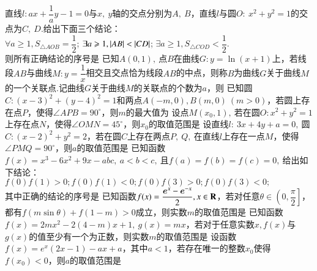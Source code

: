 \documentclass{BHCexam}
\begin{document}
\begin{questions}
\qs 直线$ l:ax+\dfrac{1}{a}y-1=0 $与$x,~y$轴的交点分别为$ A,~B $，直线$ l $与圆$ O:~x^2+y^2=1 $的交点为$ C,~D .$给出下面三个结论：\\
 $ \forall a\ge 1,S_{\triangle AOB}=\dfrac{1}{2} $;\qquad
{} $\exists a\geqslant1,\left| AB \right|<\left| CD \right|$;\qquad
{} $\exists a\ge 1,S_{\triangle COD}<\dfrac{1}{2}$.\\
则所有正确结论的序号是\xx
{} 
\qs 已知$ A(0,1),~ $点$ B $在曲线$ G:y=\ln (x+1) $上，若线段$ AB $与曲线$ M:y=\dfrac{1}{x} $相交且交点恰为线段$ AB $的中点，则称$ B $为曲线$ G $关于曲线$ M $的一个关联点.记曲线$ G $关于曲线$ M $的关联点的个数为$ a $，则\xx
{}
\qs 已知圆$ C:(x-3)^2+(y-4)^2=1 $和两点$ A(-m,0),B(m,0)~(m>0) $，若圆上存在点$ P $，使得$ \angle APB=90^{\circ} $，则$ m $的最大值为\xx
{}
\qs 设点$ M(x_0,1),~ $若在圆$ O: x^2+y^2=1 $上存在点$ N $，使得$ \angle OMN=45^{\circ} $，则$ x_0 $的取值范围是\xx
{}
\qs 设直线$ l:~3x+4y+a=0,~ $圆$ C:(x-2)^2+y^2=2 $，若在圆$ C $上存在两点$ P,~Q,~ $在直线$ l $上存在一点$ M $，使得$ \angle PMQ =90^{\circ}$，则$ a $的取值范围是\xx
{}
\qs 已知函数$f(x)=x^3-6x^2+9x-abc,~a<b<c,~$且$ f(a)=f(b)=f(c)=0 ,~$给出如下结论：\\
 $ f(0)f(1)>0 ;$\quad {}$f(0)f(1)<0;$\quad {}$f(0)f(3)>0;$\quad {}$f(0)f(3)<0;$\\
其中正确的结论的序号是\xx
{}
\qs 已知函数$f(x)=\dfrac{\bm{e}^x-\bm{e}^{-x}}{2},x\in\mathbf{R}$，若对任意$ \theta\in\left(0,\dfrac{\pi}{2}\right] $，都有$ f(m\sin \theta)+f(1-m)>0 $成立，则实数$ m $的取值范围是\xx
\onech{$ \left(0,1\right)$}{$ \left(0,2\right)$}{$ \left(-\infty,1\right)$}{$ \left(-\infty,1\right]$}
\qs 已知函数$f(x)=2mx^2-2(4-m)x+1,~g(x)=mx$，若对于任意实数$ x ,f(x)$与$g(x)$的值至少有一个为正数，则实数$ m $的取值范围是\xx
{}
\question
设函数$f(x)=e^x(2x-1)-ax+a$，其中$a<1$，若存在唯一的整数$x_0$使得$f(x_0)<0$，则$a$的取值范围是\xx
\onech{$\Big[-\dfrac{3}{2e},1\Big)$}{$\Big[-\dfrac{3}{2e},\dfrac{3}{4}\Big)$}{$\Big[\dfrac{3}{2e},\dfrac{3}{4}\Big)$}{$\Big[\dfrac{3}{2e},1\Big)$}

\end{questions}
\end{document}
